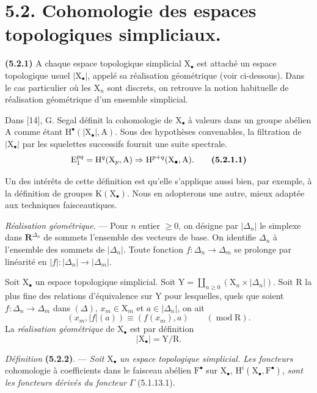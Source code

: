 \documentclass[11pt,leqno]{article}
\begin{document}
\section*{5.2. Cohomologie des espaces topologiques simpliciaux.}

\textbf{(5.2.1)} A chaque espace topologique simplicial \(\mathrm{X}_{\bullet}\) est attaché un espace topologique usuel \(\lvert\mathrm{X}_{\bullet}\rvert\), appelé sa réalisation géométrique (voir ci-dessous). Dans le cas particulier où les \(\mathrm{X}_n\) sont discrets, on retrouve la notion habituelle de réalisation géométrique d’un ensemble simplicial.

Dans [14], G. Segal définit la cohomologie de \(\mathrm{X}_{\bullet}\) à valeurs dans un groupe abélien \(\mathrm{A}\) comme étant \(\mathrm{H}^{\bullet}(\lvert\mathrm{X}_{\bullet}\rvert,\mathrm{A})\). Sous des hypothèses convenables, la filtration de \(\lvert\mathrm{X}_{\bullet}\rvert\) par les squelettes successifs fournit une suite spectrale.
\[
\mathrm{E}_1^{pq}
=\mathrm{H}^q(\mathrm{X}_p,\mathrm{A})
\Rightarrow\mathrm{H}^{p+q}(\mathrm{X}_{\bullet},\mathrm{A}).
\tag*{\textbf{(5.2.1.1)}}
\]

Un des intérêts de cette définition est qu’elle s’applique aussi bien, par exemple, à la définition de groupes \(\mathrm{K}(\mathrm{X}_{\bullet})\). Nous en adopterons une autre, mieux adaptée aux techniques faisceautiques.

\textit{Réalisation géométrique.} — Pour \(n\) entier \(\geq0\), on désigne par \(\lvert\Delta_n\rvert\) le simplexe dans \(\mathbf{R}^{\Delta_n}\) de sommets l’ensemble des vecteurs de base. On identifie \(\Delta_n\) à l’ensemble des sommets de \(\lvert\Delta_n\rvert\). Toute fonction \(f:\Delta_n\to\Delta_m\) se prolonge par linéarité en \(\lvert f\rvert:\lvert\Delta_n\rvert\to\lvert\Delta_m\rvert\).

Soit \(\mathrm{X}_{\bullet}\) un espace topologique simplicial. Soit \(\mathrm{Y}=\coprod\limits_{n\geq0}(\mathrm{X}_n\times\lvert\Delta_n\rvert)\). Soit \(\mathrm{R}\) la plus fine des relations d’équivalence sur \(\mathrm{Y}\) pour lesquelles, quels que soient \(f:\Delta_n\to\Delta_m\) dans \((\Delta)\), \(x_m\in\mathrm{X}_m\) et \(a\in\lvert\Delta_n\rvert\), on ait
\[
(x_m,\lvert f\rvert(a))\equiv(f(x_m),a)\qquad(\operatorname{mod}\mathrm{R}).
\]
La \textit{réalisation géométrique} de \(\mathrm{X}_{\bullet}\) est par définition
\[
\lvert\mathrm{X}_{\bullet}\rvert=\mathrm{Y}/\mathrm{R}.
\]

\textit{Définition} \textbf{(5.2.2)}. — \textit{Soit} \(\mathrm{X}_{\bullet}\) \textit{un espace topologique simplicial. Les foncteurs} cohomologie à coefficients dans le faisceau abélien \(\mathrm{F}^{\bullet}\) sur \(\mathrm{X}_{\bullet}\), \(\mathrm{H}^i(\mathrm{X}_{\bullet},\mathrm{F}^{\bullet})\), \textit{sont les foncteurs dérivés du foncteur} \(\Gamma\) (5.1.13.1).
\end{document}
